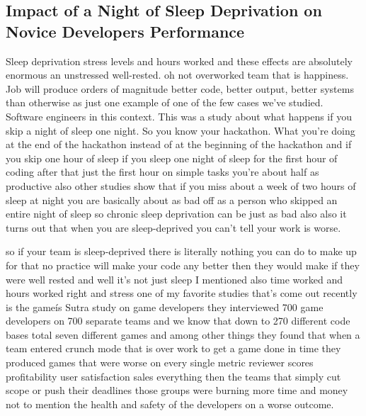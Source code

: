 \documentclass[14pt]{extreport}
\begin{document}
\subsection{Impact of a Night of Sleep Deprivation on Novice Developers Performance}
Sleep deprivation stress levels and hours worked and these effects are absolutely enormous an unstressed well-rested. oh not overworked team that is happiness. Job will produce orders of magnitude better code, better output, better systems than otherwise as just one example of one of the few cases we've studied.
Software engineers in this context. This was a study about what happens if you skip a night of sleep one night. 
So you know your hackathon. 
What you're doing at the end of the hackathon instead of at the beginning of the hackathon and if you skip one hour of sleep if you sleep one night of sleep for the first hour of coding after that just the first hour on simple tasks you're about half as productive also other studies show that if you miss about a week of two hours of sleep at night you are basically about as bad off as a person who skipped an entire night of sleep so chronic sleep deprivation can be just as bad also also it turns out that when you are sleep-deprived you can't tell your work is worse. \par
so if your team is sleep-deprived there is literally nothing you can do to make up for that no practice will make your code any better then they would make if they were well rested and well it's not just sleep I mentioned also time worked and hours worked right and stress one of my favorite studies that's come out recently is the gameís Sutra study on game developers they interviewed 700 game developers on 700 separate teams and we know that down to 270 different code bases total seven different games and among other things they found that when a team entered crunch mode that is over work to get a game done in time they produced games that were worse on every single metric reviewer scores profitability user satisfaction sales everything then the teams that simply cut scope or push their deadlines those groups were burning more time and money not to mention the health and safety of the developers on a worse outcome. 
\end{document}
